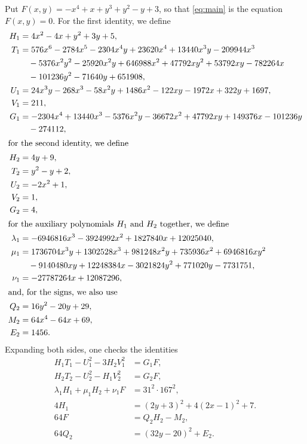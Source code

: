 \documentclass[11pt]{article}
\begin{document}
Put $F(x,y)=-x^{4}+x+y^{3}+y^{2}-y+3$, so that \eqref{eq:main} is the equation $F(x,y)=0$. For the first identity, we define
\begin{align*}
H_{1}&=4x^{2}-4x+y^{2}+3y+5,\\
T_{1}&=576x^{6}-2784x^{5}-2304x^{4}y+23620x^{4}+13440x^{3}y-209944x^{3}\\
&\quad-5376x^{2}y^{2}-25920x^{2}y+646988x^{2}+47792xy^{2}+53792xy-782264x\\
&\quad-101236y^{2}-71640y+651908,\\
U_{1}&=24x^{3}y-268x^{3}-58x^{2}y+1486x^{2}-122xy-1972x+322y+1697,\\
V_{1}&=211,\\
G_{1}&=-2304x^{4}+13440x^{3}-5376x^{2}y-36672x^{2}+47792xy+149376x-101236y\\
&\quad-274112,\\
\intertext{for the second identity, we define}
H_{2}&=4y+9,\\
T_{2}&=y^{2}-y+2,\\
U_{2}&=-2x^{2}+1,\\
V_{2}&=1,\\
G_{2}&=4,\\
\intertext{for the auxiliary polynomials $H_{1}$ and $H_{2}$ together, we define}
\lambda_{1}&=-6946816x^{3}-3924992x^{2}+1827840x+12025040,\\
\mu_{1}&=1736704x^{3}y+1302528x^{3}+981248x^{2}y+735936x^{2}+6946816xy^{2}\\
&\quad-9140480xy+12248384x-3021824y^{2}+771020y-7731751,\\
\nu_{1}&=-27787264x+12087296,\\
\intertext{and, for the signs, we also use}
Q_{2}&=16y^{2}-20y+29,\\
M_{2}&=64x^{4}-64x+69,\\
E_{2}&=1456.
\end{align*}
Expanding both sides, one checks the identities
\begin{align}
H_{1}T_{1}-U_{1}^2-3H_{2}V_{1}^2&=G_{1}F,\label{eq:norm1}\\
H_{2}T_{2}-U_{2}^2-H_{1}V_{2}^2&=G_{2}F,\label{eq:norm2}\\
\lambda_{1}H_{1}+\mu_{1}H_{2}+\nu_{1}F&=31^{2}\cdot 167^{2},\label{eq:cross1}\\
4H_{1}&=(2y+3)^2+4(2x-1)^2+7.\label{eq:sign1}\\
64F&=Q_{2}H_{2}-M_{2},\label{eq:sign2}\\
64Q_{2}&=(32y-20)^2+E_{2}.\label{eq:sign2b}
\end{align}
\end{document}
